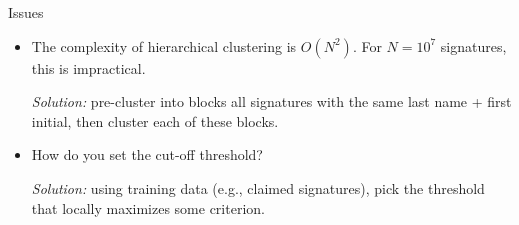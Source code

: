 \documentclass{beamer}
\begin{document}
\begin{frame}{Issues}

\begin{itemize}
\item The complexity of hierarchical clustering is {\color{red} $O(N^2)$}. For $N=10^7$ signatures, this is impractical.

{\it Solution:} pre-cluster into blocks all signatures with the same last name + first initial, then cluster each of these blocks.\\[2em]

\item How do you set the {\color{red} cut-off threshold}?

{\it Solution:} using training data (e.g., claimed signatures), pick the threshold that locally maximizes some criterion.
\end{itemize}

\end{frame}


\end{document}
